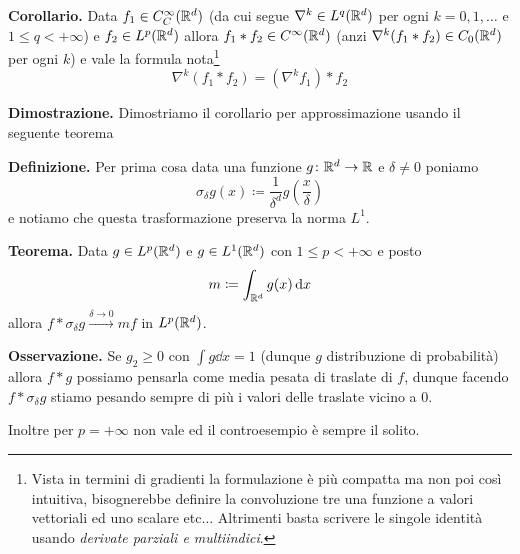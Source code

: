 \documentclass[a4paper, 12pt]{report}
\begin{document}
\textbf{Corollario.}
Data $f_1 \in C_C^\infty(\mathbb R^d)$ (da cui segue $\nabla^k \in L^q(\mathbb R^d)$ per ogni $k = 0, 1, \dots$ e $1 \leq q < +\infty$) e $f_2 \in L^p(\mathbb R^d)$ allora $f_1 \ast f_2 \in C^\infty(\mathbb R^d)$ (anzi $\nabla^k(f_1 \ast f_2) \in C_0(\mathbb R^d)$ per ogni $k$) e vale la formula nota\footnote{Vista in termini di gradienti la formulazione è più compatta ma non poi così intuitiva, bisognerebbe definire la convoluzione tre una funzione a valori vettoriali ed uno scalare etc... Altrimenti basta scrivere le singole identità usando \textit{derivate parziali e multiindici}.}
$$
\nabla^k (f_1 \ast f_2) = (\nabla^k f_1) \ast f_2
$$

\textbf{Dimostrazione.}
Dimostriamo il corollario per approssimazione usando il seguente teorema

\begin{wrapfigure}{r}{200pt}
	\centering
	\vspace{-1.5\baselineskip}
	\vspace{-2.5\baselineskip}
\end{wrapfigure}

\textbf{Definizione.} 
Per prima cosa data una funzione $g \colon \mathbb R^d \to \mathbb R$ e $\delta \neq 0$ poniamo
$$
\sigma_\delta g(x) \coloneqq \frac{1}{\delta^d} g\left( \frac{x}{\delta} \right)
$$
e notiamo che questa trasformazione preserva la norma $L^1$.

\textbf{Teorema.}
Data $g \in L^p(\mathbb R^d)$ e $g \in L^1(\mathbb R^d)$ con $1 \leq p < +\infty$ e posto
$$
m \coloneqq \int_{\mathbb R^d} g(x) \,\mathrm{d} x
$$
allora $f \ast \sigma_\delta g \xrightarrow{\delta \to 0} m f$ in $L^p(\mathbb R^d)$.

\textbf{Osservazione.}
Se $g_2 \geq 0$ con $\int g \dd x = 1$ (dunque $g$ distribuzione di probabilità) allora $f \ast g$ possiamo pensarla come media pesata di traslate di $f$, dunque facendo $f \ast \sigma_\delta g$ stiamo pesando sempre di più i valori delle traslate vicino a $0$. 

Inoltre per $p = +\infty$ non vale ed il controesempio è sempre il solito.
\end{document}
